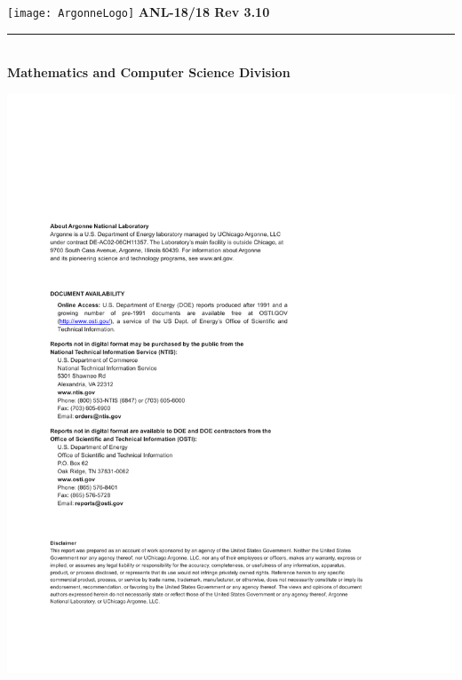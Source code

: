 
%



\def\shortintro{false}

\usepackage{fancyhdr,lastpage}
\pagestyle{fancy}



\pagestyle{empty}
\hspace{-.65in}\texttt{[image: ArgonneLogo]}
\hfill  {\large {\bf ANL-18/18 Rev 3.10}}

\vspace*{2in}
\vspace*{8pt}
\hrule
\vspace*{8pt}

\vspace*{1in}
\noindent \\
{\Large {\bf Mathematics and Computer Science Division}}

\vspace*{10pt}
\vspace*{20pt}



\newpage
\centerline{\includegraphics{ArgonneReportTemplate2018Page2}}
\newpage

